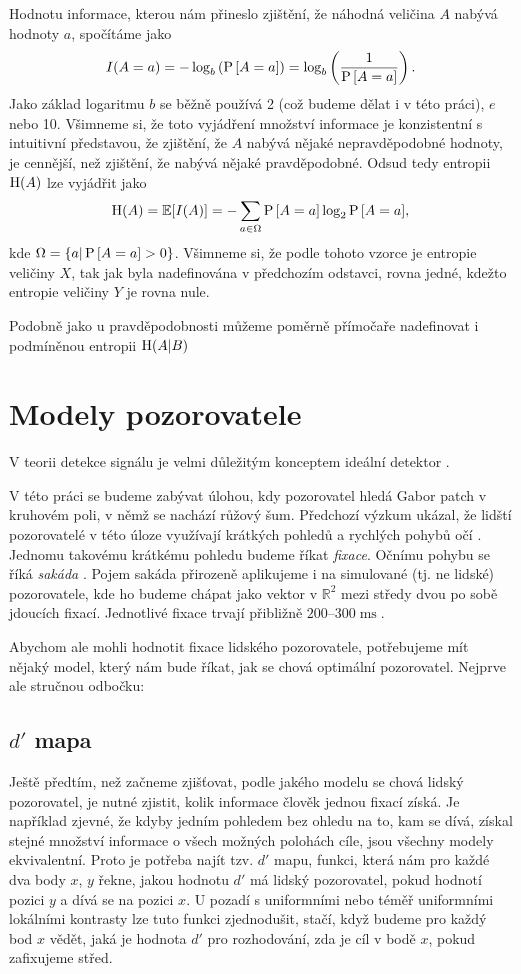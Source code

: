 Hodnotu informace, kterou nám přineslo zjištění, že náhodná veličina $A$ nabývá
hodnoty $a$, spočítáme jako $$I(A=a)=-\log_b\left({\P{A=a}}\right)=\log_b\left(\frac1{\P{A=a}}\right).$$ Jako
základ logaritmu $b$ se běžně používá 2 (což budeme dělat i v této práci), $e$
nebo 10. Všimneme si, že toto vyjádření množství informace je konzistentní s
intuitivní představou, že zjištění, že $A$ nabývá nějaké nepravděpodobné
hodnoty, je cennější, než zjištění, že nabývá nějaké pravděpodobné. Odsud tedy
entropii $\H(A)$ lze vyjádřit jako $$\H(A)=\mathbb{E}[I(A)]=-\displaystyle\sum_{a
\in \Omega}\P{A=a}\log_2{\P{A=a}},$$ kde $\Omega = \{a|\P{A=a} > 0\}$.
Všimneme si, že podle tohoto vzorce je entropie veličiny $X$, tak jak byla
nadefinována v předchozím odstavci, rovna jedné, kdežto  entropie veličiny $Y$
je rovna nule.

Podobně jako u pravděpodobnosti můžeme poměrně přímočaře nadefinovat i   
podmíněnou entropii $\H(A| B)$

\section{Modely pozorovatele}

V teorii detekce signálu je velmi důležitým konceptem ideální detektor \citep{GreenSDT}.

V této práci se budeme zabývat úlohou, kdy pozorovatel hledá Gabor patch v
kruhovém poli, v němž se nachází růžový šum. Předchozí výzkum ukázal, že lidští
pozorovatelé v této úloze využívají krátkých pohledů a rychlých pohybů očí \citep{Najemnik05}.
Jednomu takovému krátkému pohledu budeme říkat \emph{fixace}. Očnímu pohybu
se říká \emph{sakáda} \citep{sakady}. Pojem sakáda přirozeně aplikujeme i na simulované
(tj. ne lidské) pozorovatele, kde ho budeme chápat jako vektor v $\mathbb{R}^2$
mezi středy dvou po sobě jdoucích fixací. Jednotlivé fixace trvají přibližně
$200$--$300 \operatorname{ms}$.

Abychom ale mohli hodnotit fixace lidského pozorovatele, potřebujeme mít nějaký
model, který nám bude říkat, jak se chová optimální pozorovatel. Nejprve ale
stručnou odbočku:

\subsection{$d'$ mapa}

Ještě předtím, než začneme zjišťovat, podle jakého modelu se chová lidský
pozorovatel, je nutné zjistit, kolik informace člověk jednou fixací získá. Je
například zjevné, že kdyby jedním pohledem bez ohledu na to, kam se dívá,
získal stejné množství informace o všech možných polohách cíle, jsou všechny
modely ekvivalentní. Proto je potřeba najít tzv. $d'$ mapu, funkci, která nám
pro každé dva body $x$, $y$ řekne, jakou hodnotu $d'$ má lidský pozorovatel,
pokud hodnotí pozici $y$ a dívá se na pozici $x$. U pozadí s uniformními nebo
téměř uniformními lokálními kontrasty lze tuto funkci zjednodušit, stačí, když
budeme pro každý bod $x$ vědět, jaká je hodnota $d'$ pro rozhodování, zda je
cíl v bodě $x$, pokud zafixujeme střed.

